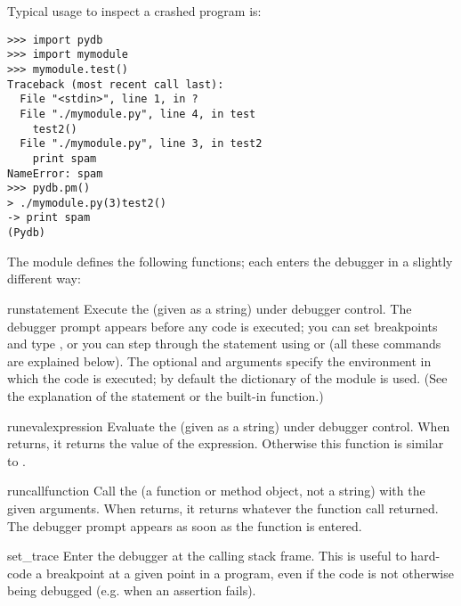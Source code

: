 Typical usage to inspect a crashed program is:

\begin{verbatim}
>>> import pydb
>>> import mymodule
>>> mymodule.test()
Traceback (most recent call last):
  File "<stdin>", line 1, in ?
  File "./mymodule.py", line 4, in test
    test2()
  File "./mymodule.py", line 3, in test2
    print spam
NameError: spam
>>> pydb.pm()
> ./mymodule.py(3)test2()
-> print spam
(Pydb) 
\end{verbatim}

The module defines the following functions; each enters the debugger
in a slightly different way:

\begin{funcdesc}{run}{statement}
Execute the  (given as a string) under debugger
control.  The debugger prompt appears before any code is executed; you
can set breakpoints and type , or you can step through
the statement using  or  (all these commands are
explained below).  The optional  and 
arguments specify the environment in which the code is executed; by
default the dictionary of the module  is
used.  (See the explanation of the  statement or the
 built-in function.)
\end{funcdesc}

\begin{funcdesc}{runeval}{expression}
Evaluate the  (given as a string) under debugger
control.  When  returns, it returns the value of the
expression.  Otherwise this function is similar to
.
\end{funcdesc}

\begin{funcdesc}{runcall}{function}
Call the  (a function or method object, not a string)
with the given arguments.  When  returns, it returns
whatever the function call returned.  The debugger prompt appears as
soon as the function is entered.
\end{funcdesc}

\begin{funcdesc}{set_trace}{}
Enter the debugger at the calling stack frame.  This is useful to
hard-code a breakpoint at a given point in a program, even if the code
is not otherwise being debugged (e.g. when an assertion fails).
\end{funcdesc}


